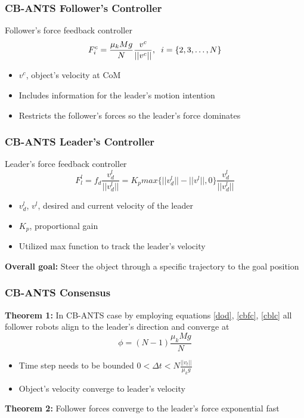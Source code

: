 \documentclass{beamer}
\begin{document}
\begin{frame}
\frametitle{CB-ANTS Follower's Controller}
Follower's force feedback controller 
\begin{equation}\label{cbfc}
F_i^c=\frac{\mu_k Mg}{N}\frac{v^c}{||v^c||}, \hspace{.2cm} i=\{ 2,3,\hdots , N\}
\end{equation}
\begin{itemize}
\item $v^c$, object's velocity at CoM \vspace{.2cm}
\item Includes information for the leader's motion intention \vspace{.2cm}
\item Restricts the follower's forces so the leader's force dominates
\end{itemize}
\end{frame}

\begin{frame}
\frametitle{CB-ANTS Leader's Controller}
Leader's force feedback controller 
\begin{equation}\label{cblc}
F_l^l= f_d \frac{v_d^l}{||v_d^l||}= K_pmax\{ ||v_d^l||-||v^l||,0 \}\frac{v_d^l}{||v_d^l||}
\end{equation}
\begin{itemize}
\item $v_d^l$, $v^l$, desired and current velocity of the leader
\item $K_p$, proportional gain
\item Utilized max function to track the leader's velocity\vspace{.3cm}
\end{itemize}
\textbf{Overall goal:} Steer the object through a specific trajectory to the goal position
\end{frame}
\begin{frame}
\frametitle{CB-ANTS Consensus}
\textbf{Theorem 1:} In CB-ANTS case by employing equations \ref{dod}, \ref{cbfc}, \ref{cblc} all follower robots align to the leader's direction and converge at
\begin{equation}
\phi = (N-1)\frac{\mu_kMg}{N}
\end{equation}
\begin{itemize}
\item Time step needs to be bounded $0<\Delta t<N\frac{||v_t||}{\mu_kg}$ 
\item Object's velocity converge to leader's velocity\vspace{.2cm}
\end{itemize}
\textbf{Theorem 2:} Follower forces converge to the leader's force exponential fast
\end{frame}
\end{document}
